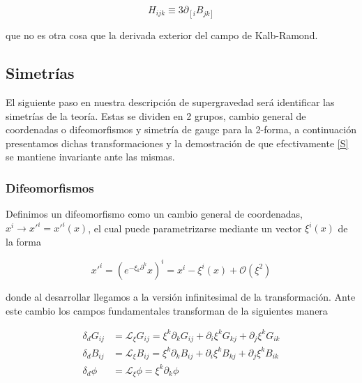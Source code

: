 \documentclass{article}
\numberwithin{equation}{section}
\begin{document}
\begin{equation}\label{H}
H_{i j k} \equiv 3 \partial_{\left[ i \right.} B_{\left. j k \right] }
\end{equation}

que no es otra cosa que la derivada exterior del campo de Kalb-Ramond.

\subsection{\textcolor{teal!60!white}{Simetrías}}

El siguiente paso en nuestra descripción de supergravedad será identificar las simetrías de la teoría. Estas se dividen en 2 grupos, cambio general de coordenadas o difeomorfismos y simetría de gauge para la 2-forma, a continuación presentamos dichas transformaciones y la demostración de que efectivamente \ref{S} se mantiene invariante ante las mismas.

\subsubsection{Difeomorfismos}


Definimos un difeomorfismo como un cambio general de coordenadas, $ x^{i} \longrightarrow x'^{i}=x'^{i}(x) $, el cual puede parametrizarse mediante un vector $ \xi^{i}(x) $ de la forma
	
\begin{equation*}
x'^{i}=\left(e^{-\xi_{k} \partial^{k}} x\right)^{i}= x^{i} - \xi^{i}(x) + \mathcal{O}(\xi^2)
\end{equation*} 
	
donde al desarrollar llegamos a la versión infinitesimal de la transformación. Ante este cambio los campos fundamentales transforman de la siguientes manera
	
\begin{subequations}
\begin{align}
\label{deltag}
\delta_d G_{i j} &= \mathcal{L}_{\xi}G_{i j} = \xi^k \partial_k G_{i j} + \partial_i \xi^k G_{k j} + \partial_j \xi^k G_{i k}\\ 
\label{deltab}
\delta_d B_{i j} &= \mathcal{L}_{\xi}B_{i j} = \xi^k \partial_k B_{i j} + \partial_i \xi^k B_{k j} + \partial_j \xi^k B_{i k}\\ 
\label{deltafi}
\delta_d \phi &= \mathcal{L}_{\xi} \phi = \xi^k \partial_k \phi
\end{align}
\end{subequations}
	
\end{document}
